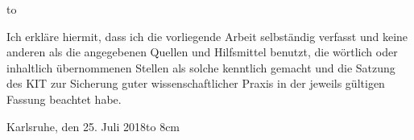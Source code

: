 \thispagestyle{empty}
\vspace*{32\baselineskip}
\hbox to \textwidth{\hrulefill}
\par
Ich erkläre hiermit, dass ich die vorliegende Arbeit selbständig verfasst und
keine anderen als die angegebenen Quellen und Hilfsmittel benutzt, 
die wörtlich oder inhaltlich übernommenen Stellen als solche kenntlich 
gemacht und die Satzung des KIT zur Sicherung guter wissenschaftlicher 
Praxis in der jeweils gültigen Fassung beachtet habe.

\vspace*{2cm}
Karlsruhe, den 25. Juli 2018\hfill \hbox to 8cm{\hrulefill}

\clearpage






